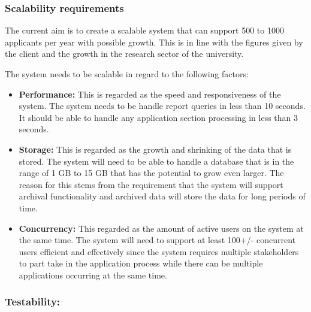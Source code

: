 \documentclass[12pt]{article}
\begin{document}
		\vspace{0.1in}
		
		\subsubsection{Scalability requirements}
		
		\begin{flushleft}
		
		The current aim is to create a scalable system that can support 500 to 1000 applicants per year with possible growth. This is in line with the figures given by the client and the growth in the research sector of the university.\\
		\vspace{0.05in}
		
		The system needs to be scalable in regard to the following factors:
		\begin{itemize}
		
		
		\item\textbf{Performance:} This is regarded as the speed and responsiveness of the system.		
		The system needs to be handle report queries in less than 10 seconds. It should be able to handle any application section processing in less than 3 seconds.\\
		
		\item\textbf{Storage:} This is regarded as the growth and shrinking of the data that is stored.
		The system will need to be able to handle a database that is in the range of 1 GB to 15 GB that has the potential to grow even larger.  The reason for this stems from the requirement that the system will support archival functionality and archived data will store the data for long periods of time.\\
		 
		\item\textbf{Concurrency:} This regarded as the amount of active users on the system at the same time.		
		The system will need to support at least 100+/- concurrent users efficient and effectively since the system requires multiple stakeholders to part take in the application process while there can be multiple applications occurring at the same time.\\ 
		 
		\end{itemize}
		\end{flushleft}
		\vspace{0.1in}
		
		\subsubsection{Testability:}
				
\end{document}
